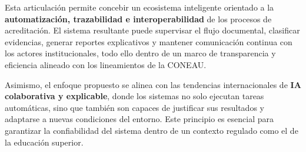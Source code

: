 \documentclass[12pt]{article}
\begin{document}
Esta articulación permite concebir un ecosistema inteligente orientado a la \textbf{automatización, trazabilidad e interoperabilidad} de los procesos de acreditación. El sistema resultante puede supervisar el flujo documental, clasificar evidencias, generar reportes explicativos y mantener comunicación continua con los actores institucionales, todo ello dentro de un marco de transparencia y eficiencia alineado con los lineamientos de la CONEAU.

Asimismo, el enfoque propuesto se alinea con las tendencias internacionales de \textbf{IA colaborativa y explicable}, donde los sistemas no solo ejecutan tareas automáticas, sino que también son capaces de justificar sus resultados y adaptarse a nuevas condiciones del entorno. Este principio es esencial para garantizar la confiabilidad del sistema dentro de un contexto regulado como el de la educación superior.






\end{document}
